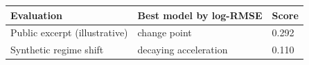\begin{tabular}{lll}
\toprule
Evaluation & Best model by log-RMSE & Score \\
\midrule
Public excerpt (illustrative) & change point & 0.292 \\
Synthetic regime shift & decaying acceleration & 0.110 \\
\bottomrule
\end{tabular}
